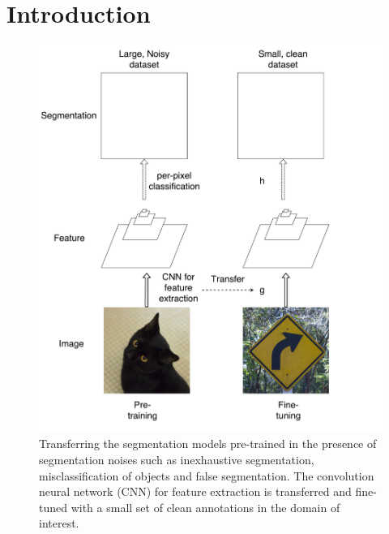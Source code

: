 \section{Introduction}
\label{introduction}




\begin{figure}[t]
\begin{center}
   \includegraphics[width=1.05\linewidth]{img/figure1}
\end{center}
   \caption{
   Transferring the segmentation models pre-trained in the presence of segmentation noises such as inexhaustive segmentation, misclassification of objects and false segmentation.
   The convolution neural network (CNN) for feature extraction is transferred and fine-tuned with a small set of clean annotations in the domain of interest.
   }
\label{fig:long}
\label{fig:onecol}
\end{figure}


